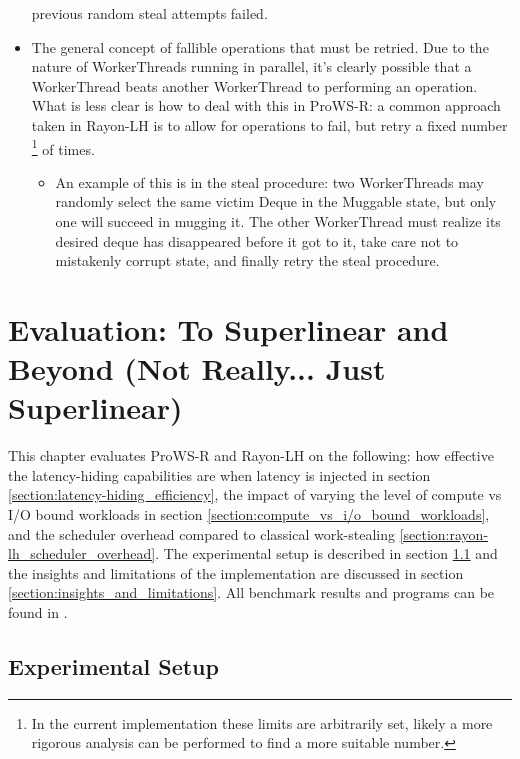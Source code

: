 \documentclass[bsc,frontabs,singlespacing,parskip,deptreport,normalheadings]{infthesis}
\begin{document}
\begin{itemize}
        previous random steal attempts failed.
    \item The general concept of fallible operations that must be retried. Due
        to the nature of WorkerThreads running in parallel, it's clearly
        possible that a WorkerThread beats another WorkerThread to performing an
        operation. What is less clear is how to deal with this in ProWS-R: a
        common approach taken in Rayon-LH is to allow for operations to fail,
        but retry a fixed number \footnote{In the current implementation these
        limits are arbitrarily set, likely a more rigorous analysis can be
        performed to find a more suitable number.} of times.
    \begin{itemize}
        \item An example of this is in the steal procedure: two WorkerThreads
            may randomly select the same victim Deque in the Muggable state, but
            only one will succeed in mugging it. The other WorkerThread must
            realize its desired deque has disappeared before it got to it, take
            care not to mistakenly corrupt state, and finally retry the steal
            procedure.
    \end{itemize}
\end{itemize}


\chapter{Evaluation: To Superlinear and Beyond (Not Really... Just Superlinear)}
\label{chapter:evaluation:_to_superlinear_and_beyond_(not_really..._just_superlinear)}

This chapter evaluates ProWS-R and Rayon-LH on the following: how effective the
latency-hiding capabilities are when latency is injected in section
\ref{section:latency-hiding_efficiency}, the impact of varying the level of
compute vs I/O bound workloads in section
\ref{section:compute_vs_i/o_bound_workloads}, and the scheduler overhead
compared to classical work-stealing \ref{section:rayon-lh_scheduler_overhead}.
The experimental setup is described in section \ref{section:experimental_setup}
and the insights and limitations of the implementation are discussed in section
\ref{section:insights_and_limitations}. All benchmark results and programs can
be found in \cite{noauthor_rayon-lh_nodate}.

\section{Experimental Setup}
\label{section:experimental_setup}
\end{document}
